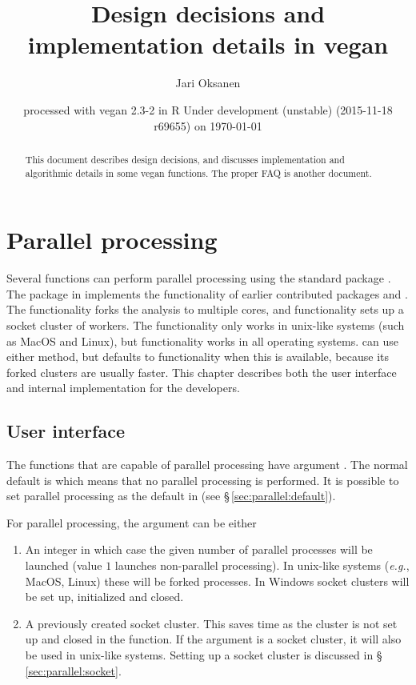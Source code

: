 \documentclass[a4paper,10pt,twocolumn]{article}
\author{Jari Oksanen}
\title{Design decisions and implementation details in vegan}
\date{\footnotesize{
  processed with vegan
2.3-2
in R Under development (unstable) (2015-11-18 r69655) on \today}}
\begin{document}




\maketitle

\begin{abstract}
  This document describes design decisions, and discusses implementation
and algorithmic details in some vegan functions. The proper FAQ is
another document.
\end{abstract}

\tableofcontents

\section{Parallel processing}

Several  functions can perform parallel processing using
the standard \R{} package . 
The  package in \R{} implements
the functionality of earlier contributed packages  and
.  The  functionality forks the analysis to
multiple cores, and  functionality sets up a socket cluster
of workers.  The  functionality only works in unix-like
systems (such as MacOS and Linux), but  functionality works
in all operating systems.   can use either method, but
defaults to  functionality when this is available,
because its forked clusters are usually faster.  This chapter
describes both the user interface and internal implementation for the
developers.

\subsection{User interface}
\label{sec:parallel:ui}

The functions that are capable of parallel processing have argument
.  The normal default is  which
means that no parallel processing is performed.  It is possible to set
parallel processing as the default in  (see
\S\,\ref{sec:parallel:default}). 

For parallel processing, the  argument can be either

\begin{enumerate}
\item An integer in which case the given number of parallel processes
  will be launched (value $1$ launches non-parallel processing). In
  unix-like systems (\emph{e.g.}, MacOS, Linux) these will be forked
   processes. In Windows socket clusters will be set up,
  initialized and closed.
\item A previously created socket cluster. This saves time as the
  cluster is not set up and closed in the function.  If the argument is a
  socket cluster, it will also be used in unix-like systems. Setting
  up a socket cluster is discussed in \S\,\ref{sec:parallel:socket}.
\end{enumerate}
\end{document}
